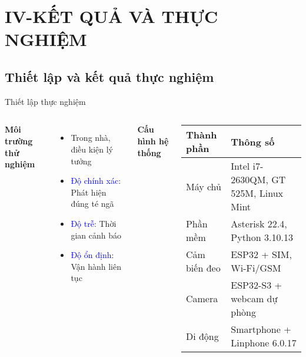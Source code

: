 \section{IV-KẾT QUẢ VÀ THỰC NGHIỆM}
\subsection{Thiết lập và kết quả thực nghiệm} 

\begin{frame}{Thiết lập thực nghiệm}
    \begin{columns}[T]
        \textbf{Môi trường thử nghiệm}
        \vspace{0.2cm}
        \begin{itemize}
            \item Trong nhà, điều kiện lý tưởng
            \item \textcolor{blue}{Độ chính xác}: Phát hiện đúng té ngã
            \item \textcolor{blue}{Độ trễ}: Thời gian cảnh báo
            \item \textcolor{blue}{Độ ổn định}: Vận hành liên tục
        \end{itemize}

        \textbf{Cấu hình hệ thống}
        \vspace{0.2cm}
        \begin{table}[h!]
            \centering
            \footnotesize
            \begin{tabular}{|p{2.5cm}|p{4cm}|}
                \hline
                \textbf{Thành phần} & \textbf{Thông số} \\
                \hline
                Máy chủ & Intel i7-2630QM, GT 525M, Linux Mint \\
                \hline
                Phần mềm & Asterisk 22.4, Python 3.10.13 \\
                \hline
                Cảm biến đeo & ESP32 + SIM, Wi-Fi/GSM \\
                \hline
                Camera & ESP32-S3 + webcam dự phòng \\
                \hline
                Di động & Smartphone + Linphone 6.0.17 \\
                \hline
            \end{tabular}
        \end{table}
    \end{columns}
\end{frame}
